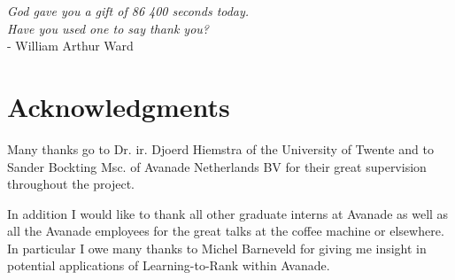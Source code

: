 
\begin{flushright}{\slshape    
   God gave you a gift of 86 400 seconds today. \\
   Have you used one to say thank you?} \\ \medskip
   - William Arthur Ward
\end{flushright}



\bigskip

\begingroup
\let\clearpage\relax
\let\cleardoublepage\relax
\let\cleardoublepage\relax
\chapter*{Acknowledgments}
Many thanks go to Dr. ir. Djoerd Hiemstra of the University of Twente and to Sander Bockting Msc. of Avanade Netherlands BV for their great supervision throughout the project.

In addition I would like to thank all other graduate interns at Avanade as well as all the Avanade employees for the great talks at the coffee machine or elsewhere. In particular I owe many thanks to Michel Barneveld for giving me insight in potential applications of Learning-to-Rank within Avanade.

\endgroup



